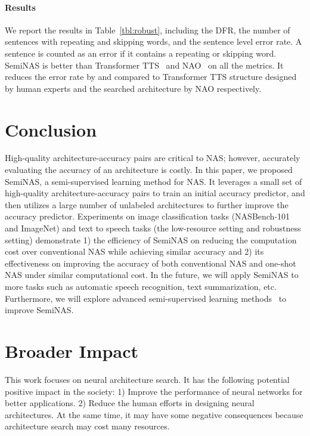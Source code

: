 \documentclass{article}
\begin{document}
\paragraph{Results} We report the results in Table~\ref{tbl:robust}, including the DFR, the number of sentences with repeating and skipping words, and the sentence level error rate. A sentence is counted as an error if it contains a repeating or skipping word. SemiNAS is better than Transformer TTS~\cite{transformertts} and NAO~\cite{nao} on all the metrics. It reduces the error rate by  and  compared to Transformer TTS structure designed by human experts and the searched architecture by NAO respectively.

\section{Conclusion}
High-quality architecture-accuracy pairs are critical to NAS; however, accurately evaluating the accuracy of an architecture is costly. In this paper, we proposed SemiNAS, a semi-supervised learning method for NAS. It leverages a small set of high-quality architecture-accuracy pairs to train an initial accuracy predictor, and then utilizes a large number of unlabeled architectures to further improve the accuracy predictor. Experiments on image classification tasks (NASBench-101 and ImageNet) and text to speech tasks (the low-resource setting and robustness setting) demonstrate 1) the efficiency of SemiNAS on reducing the computation cost over conventional NAS while achieving similar accuracy and 2) its effectiveness on improving the accuracy of both conventional NAS and one-shot NAS under similar computational cost. In the future, we will apply SemiNAS to more tasks such as automatic speech recognition, text summarization, etc. Furthermore, we will explore advanced semi-supervised learning methods~\cite{unsuperviseddataaug,mixmatch} to improve SemiNAS.


\section*{Broader Impact}
This work focuses on neural architecture search. It has the following potential positive impact in the society: 1) Improve the performance of neural networks for better applications. 2) Reduce the human efforts in designing neural architectures. At the same time, it may have some negative consequences because architecture search may cost many resources. 
\end{document}
